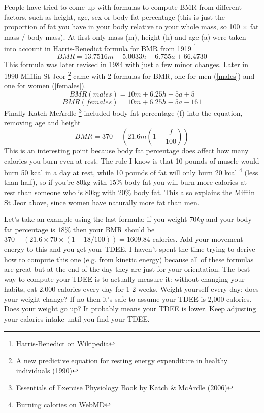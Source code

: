 \documentclass[openany, 12pt]{book}
\begin{document}
	People have tried to come up with formulas to compute BMR from different factors, such as height, age, sex or body fat percentage (this is just
	the proportion of fat you have in your body relative to your whole mass, so 100 $\times$ fat mass / body mass). At first only mass (m), height (h) 
	and age (a) were taken into account in Harris-Benedict formula for BMR from 1919
        \footnote{\href{https://en.wikipedia.org/wiki/Harris\%E2\%80\%93Benedict_equation}{Harris-Benedict on Wikipedia}}
	\begin{equation}
		BMR = 13.7516m + 5.0033h - 6.755a + 66.4730
	\end{equation}
  	This formula was later revised in 1984 with just a few minor changes. Later in 1990 Mifflin St Jeor
        \footnote{\href{https://pubmed.ncbi.nlm.nih.gov/2305711/}{A new predictive equation for resting energy expenditure in healthy individuals (1990)}}
        came with 2 formulas for BMR, one for men (\ref{males}) and one for women (\ref{females}).
	\begin{equation}
		\label{males}
		BMR (males) = 10m + 6.25h - 5a + 5
	\end{equation}
	\begin{equation}
		\label{females}
		BMR (females) = 10m + 6.25h - 5a - 161
	\end{equation}
	Finally Katch-McArdle
        \footnote{\href{https://books.google.co.uk/books/about/Essentials_of_Exercise_Physiology.html?id=L4aZIDbmV3oC}{Essentials of Exercise Physiology Book by Katch \& McArdle (2006)}}
        included body fat percentage (f) into the equation, removing age and height
	\begin{equation}
		BMR = 370 + (21.6m (1 - \frac{f}{100}))
	\end{equation}
	This is an interesting point because body fat percentage does affect how many calories you burn even at rest. The rule I know is that 10 pounds of muscle would burn 50 kcal in a day at rest,
        while 10 pounds of fat will only burn 20 kcal
        \footnote{\href{https://www.webmd.com/diet/obesity/features/8-ways-to-burn-calories-and-fight-fat}{Burning calories on WebMD}} (less than half),
        so if you're 80kg with 15\% body fat you will burn more calories at rest than someone who is 80kg with 20\% body fat. This also explains the Mifflin St Jeor above, since women have naturally
        more fat than men.
	
	Let's take an example using the last formula: if you weight $70kg$ and your body fat percentage is $18\%$ then your BMR should be $370 + (21.6 \times 70 \times (1 - 18/100)) = 1609.84$ calories.
        Add your movement energy to this and you get your TDEE. I haven't spent the time trying to derive how to
	compute this one (e.g. from kinetic energy) because all of these formulas are great but at the end of the day they are just for your orientation.
	The best way to compute your TDEE is to actually measure it: without changing your habits, eat 2,000 calories every day for 1-2 weeks. Weight
	yourself every day: does your weight change? If no then it's safe to assume your TDEE is 2,000 calories. Does your weight go up? It probably means
	your TDEE is lower. Keep adjusting your calories intake until you find your TDEE. 
	
\end{document}

